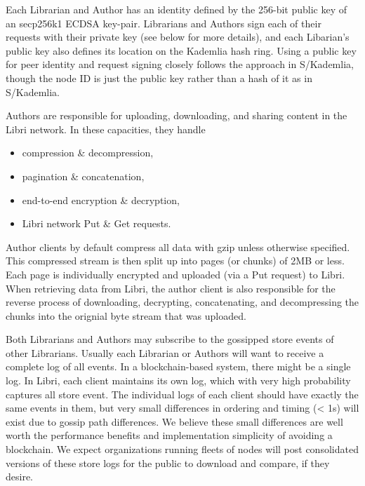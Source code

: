 \documentclass[10pt]{article}
\begin{document}
Each Librarian and Author has an identity defined by the 256-bit public key of an secp256k1 ECDSA key-pair. Librarians and Authors sign each of their requests with their private key (see \label{sec:Identity} below for more details), and each Libarian's public key also defines its location on the Kademlia hash ring. Using a public key for peer identity and request signing closely follows the approach in S/Kademlia, though the node ID is just the public key rather than a hash of it as in S/Kademlia. 

Authors are responsible for uploading, downloading, and sharing content in the Libri network. In these capacities, they handle
\begin{itemize}
	\item compression \& decompression,
	\item pagination \& concatenation,
	\item end-to-end encryption \& decryption,
	\item Libri network Put \& Get requests.
\end{itemize}

Author clients by default compress all data with gzip unless otherwise specified. This compressed stream is then split up into pages (or chunks) of 2MB or less. Each page is individually encrypted and uploaded (via a Put request) to Libri. When retrieving data from Libri, the author client is also responsible for the reverse process of downloading, decrypting, concatenating, and decompressing the chunks into the orignial byte stream that was uploaded.

Both Librarians and Authors may subscribe to the gossipped store events of other Librarians. Usually each Librarian or Authors will want to receive a complete log of all events. In a blockchain-based system, there might be a single log. In Libri, each client maintains its own log, which with very high probability captures all store event. The individual logs of each client should have exactly the same events in them, but very small differences in ordering and timing (< 1s) will exist due to gossip path differences. We believe these small differences are well worth the performance benefits and implementation simplicity of avoiding a blockchain. We expect organizations running fleets of nodes will post consolidated versions of these store logs for the public to download and compare, if they desire.
\end{document}
